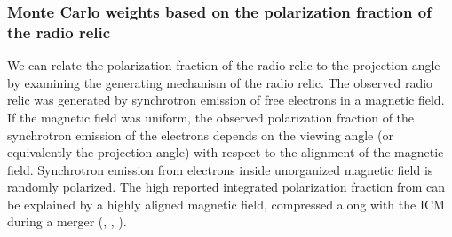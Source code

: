 \documentclass[letterpaper,useAMS,usenatbib]{mn2e}
\begin{document}

\subsubsection{Monte Carlo weights based on the polarization fraction of the radio relic}
%

We can relate the polarization fraction of the radio relic to the
projection angle by examining the
generating mechanism of the radio relic.
The observed radio relic was generated by synchrotron emission of free electrons in a
magnetic field. If the magnetic field was uniform, the observed
polarization fraction of the synchrotron emission of the electrons depends on the
viewing angle (or equivalently the projection angle) with respect to the
alignment of the magnetic field. Synchrotron emission from electrons inside
unorganized magnetic field is
randomly polarized. The high reported integrated polarization fraction from
\citet{L13} can be explained by a highly aligned magnetic field,
compressed along with the ICM during a merger
(\citealt{E98}, \citealt{vanWeeren10}, \citealt{Feretti12}).
\par
\end{document}
